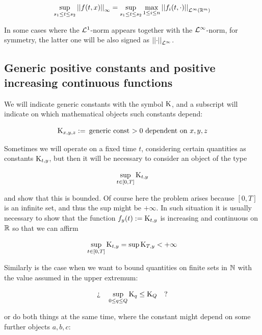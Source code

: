 \begin{equation*}
	\sup_{s_1 \leq t \leq s_2} \Normp{\infty}{f(t,x)} = \sup_{s_1 \leq t \leq s_2} \max_{1 \leq i \leq n} \Normp{\Lpspace^\infty(\R^m)}{f_i(t,\cdot)}
\end{equation*}

In some cases where the $\Lpspace^1$-norm appears together with the $\Lpspace^\infty$-norm, for symmetry, the latter one will be also signed as $\Normp{\Lpspace^\infty}{\cdot}$.


\subsection{Generic positive constants and positive increasing continuous functions}

We will indicate generic constants with the symbol $\const$, and a subscript will indicate on which mathematical objects such constants depend:

\begin{equation*}
	\const_{x,y,z}:= \: \text{generic const $>0$ dependent on $x,y,z$}
\end{equation*}

Sometimes we will operate on a fixed time $t$, considering certain quantities as constants $\const_{t,y}$, but then it will be necessary to consider an object of the type

\begin{equation*}
	\sup_{t \in [0,T]} \const_{t,y}
\end{equation*}

and show that this is bounded.
Of course here the problem arises because $[0,T]$ is an infinite set, and thus the sup might be $+\infty$.
In such situation it is usually necessary to show that the function $f_y(t) := \const_{t,y} $ is increasing and continuous on $\R$ so that we can affirm

\begin{equation*}
		\sup_{t \in [0,T]} \const_{t,y} = \sup \const_{T,y} < +\infty
\end{equation*}

Similarly is the case when we want to bound quantities on finite sets in $\N$ with the value assumed in the upper extremum: 

\begin{equation*}
	\logQuest{
		\sup_{0\leq q \leq Q} \const_{q} \leq \const_Q 
	}
\end{equation*}

or do both things at the same time, where the constant might depend on some further objects $a,b,c$:

